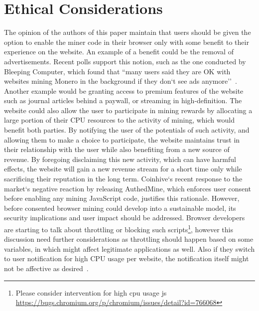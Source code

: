 \section{Ethical Considerations}

The opinion of the authors of this paper maintain that users should be given the option to enable the miner code in their browser only with some benefit to their experience on the website.  An example of a benefit could be the removal of advertisements. Recent polls support this notion, such as the one conducted by Bleeping Computer, which found that ``many users said they are OK with websites mining Monero in the background if they don`t see ads anymore''~\cite{bleepingcomputerminers}. Another example would be granting access to premium features of the website such as journal articles behind a paywall, or streaming in high-definition. The website could also allow the user to participate in mining rewards by allocating a large portion of their CPU resources to the activity of mining, which would benefit both parties. By notifying the user of the potentials of such activity, and allowing them to make a choice to participate, the website maintains trust in their relationship with the user while also benefiting from a new source of revenue. By foregoing disclaiming this new activity, which can have harmful effects, the website will gain a new revenue stream for a short time only while sacrificing their reputation in the long term. Coinhive`s recent response to the market`s negative reaction by releasing AuthedMine, which enforces user consent before enabling any mining JavaScript code, justifies this rationale. However, before consented browser mining could develop into a sustainable model, its security implications and user impact should be addressed.
Browser developers are starting to talk about throttling or blocking such scripts\footnote{Please consider intervention for high cpu usage js \url{https://bugs.chromium.org/p/chromium/issues/detail?id=766068}}, however this discussion need further considerations as throttling should happen based on some variables, in which might affect legitimate applications as well. Also if they switch to user notification for high CPU usage per website, the notification itself might not be affective as desired~\cite{SHB11}\cite{SEAAC09}.

